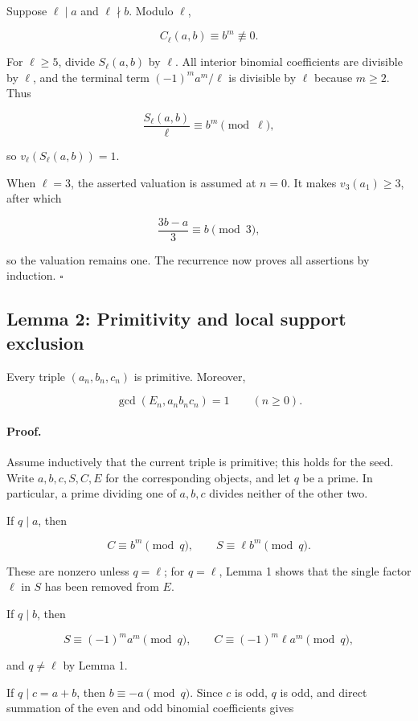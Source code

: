 \documentclass[11pt]{article}
\begin{document}
Suppose \(\ell\mid a\) and \(\ell\nmid b\). Modulo \(\ell\),

\[
C_\ell(a,b)\equiv b^m\not\equiv0.
\]

For \(\ell\geq5\), divide \(S_\ell(a,b)\) by \(\ell\). All interior
binomial coefficients are divisible by \(\ell\), and the terminal term
\((-1)^ma^m/\ell\) is divisible by \(\ell\) because \(m\geq2\). Thus

\[
\frac{S_\ell(a,b)}{\ell}\equiv b^m\pmod\ell,
\]

so \(v_\ell(S_\ell(a,b))=1\).

When \(\ell=3\), the asserted valuation is assumed at \(n=0\). It makes
\(v_3(a_1)\geq3\), after which

\[
\frac{3b-a}{3}\equiv b\pmod3,
\]

so the valuation remains one. The recurrence now proves all assertions by
induction. \(\square\)

\subsection{Lemma 2: Primitivity and local support exclusion}

Every triple \((a_n,b_n,c_n)\) is primitive. Moreover,

\[
\gcd(E_n,a_nb_nc_n)=1
\qquad(n\geq0).
\]

\paragraph{Proof.}

Assume inductively that the current triple is primitive; this holds for the
seed. Write \(a,b,c,S,C,E\) for the corresponding objects, and let \(q\)
be a prime. In particular, a prime dividing one of \(a,b,c\) divides
neither of the other two.

If \(q\mid a\), then

\[
C\equiv b^m\pmod q,
\qquad
S\equiv \ell b^m\pmod q.
\]

These are nonzero unless \(q=\ell\); for \(q=\ell\), Lemma 1 shows that
the single factor \(\ell\) in \(S\) has been removed from \(E\).

If \(q\mid b\), then

\[
S\equiv(-1)^ma^m\pmod q,
\qquad
C\equiv(-1)^m\ell a^m\pmod q,
\]

and \(q\neq\ell\) by Lemma 1.

If \(q\mid c=a+b\), then \(b\equiv-a\pmod q\). Since \(c\) is odd,
\(q\) is odd, and direct summation of the even and odd binomial
coefficients gives
\end{document}
